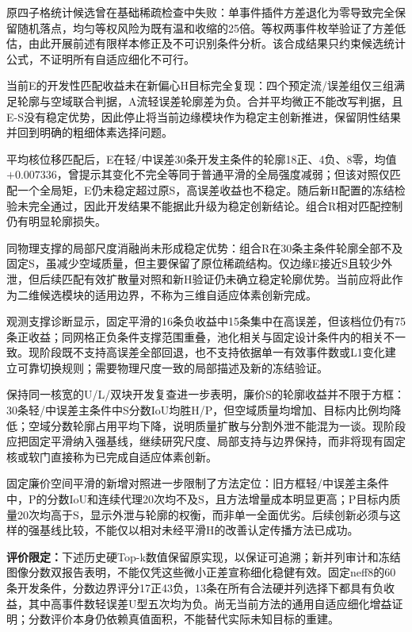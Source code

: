 \documentclass[UTF8,fontset=none,zihao=-4,a4paper]{ctexart}
\begin{document}
原四子格统计候选曾在基础稀疏检查中失败：单事件插件方差退化为零导致完全保留随机落点，均匀等权风险为既有温和收缩的25倍。等权两事件枚举验证了方差低估，由此开展前述有限样本修正及不可识别条件分析。该合成结果只约束候选统计公式，不证明所有自适应细化不可行。

当前E的开发性匹配收益未在新偏心H目标完全复现：四个预定流/误差组仅三组满足轮廓与空域联合判据，A流轻误差轮廓差为负。合并平均微正不能改写判据，且E-S没有稳定优势，因此停止将当前边缘模块作为稳定主创新推进，保留阴性结果并回到明确的粗细体素选择问题。

平均核位移匹配后，E在轻/中误差30条开发主条件的轮廓18正、4负、8零，均值$+0.007336$，曾提示其变化不完全等同于普通平滑的全局强度减弱；但该对照仅匹配一个全局矩，E仍未稳定超过原S，高误差收益也不稳定。随后新H配置的冻结检验未完全通过，因此开发结果不能据此升级为稳定创新结论。组合R相对匹配控制仍有明显轮廓损失。

同物理支撑的局部尺度消融尚未形成稳定优势：组合R在30条主条件轮廓全部不及固定S，虽减少空域质量，但主要保留了原位稀疏结构。仅边缘E接近S且较少外泄，但后续匹配有效扩散量对照和新H验证仍未确立稳定轮廓优势。当前应将此作为二维候选模块的适用边界，不称为三维自适应体素创新完成。

观测支撑诊断显示，固定平滑的16条负收益中15条集中在高误差，但该档位仍有75条正收益；同网格正负条件支撑范围重叠，池化相关与固定设计条件内的相关不一致。现阶段既不支持高误差全部回退，也不支持依据单一有效事件数或L1变化建立可靠切换规则；需要物理尺度一致的局部描述及新的冻结验证。

保持同一核宽的U/L/双块开发复查进一步表明，廉价S的轮廓收益并不限于方框：30条轻/中误差主条件中S分数IoU均胜H/P，但空域质量均增加、目标内比例均降低；空域分数轮廓占用平均下降，说明质量扩散与分割外泄不能混为一谈。现阶段应把固定平滑纳入强基线，继续研究尺度、局部支持与边界保持，而非将现有固定核或软门直接称为已完成自适应体素创新。

固定廉价空间平滑的新增对照进一步限制了方法定位：旧方框轻/中误差主条件中，P的分数IoU和连续代理20次均不及S，且方法增量成本明显更高；P目标内质量20次均高于S，显示外泄与轮廓的权衡，而非单一全面优劣。后续创新必须与这样的强基线比较，不能仅以相对未经平滑H的改善认定传播方法已成功。

\noindent\textbf{评价限定：}下述历史硬Top-k数值保留原实现，以保证可追溯；新并列审计和冻结图像分数双报告表明，不能仅凭这些微小正差宣称细化稳健有效。固定neff8的60条开发条件，分数边界评分17正43负，13条在所有合法硬并列选择下都具有负收益，其中高事件数轻误差U型五次均为负。尚无当前方法的通用自适应细化增益证明；分数评价本身仍依赖真值面积，不能替代实际未知目标的重建。
\end{document}
